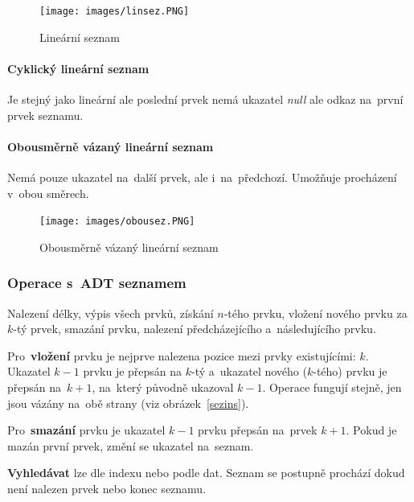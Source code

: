 \begin{figure}[ht]
	\centering
	\texttt{[image: images/linsez.PNG]}
	\caption{Lineární seznam}
	\label{linsez}
\end{figure}

\paragraph{Cyklický lineární seznam} Je stejný jako lineární ale poslední prvek nemá ukazatel \emph{null} ale odkaz na~první prvek seznamu.

\paragraph{Obousměrně vázaný lineární seznam} Nemá pouze ukazatel na~další prvek, ale i~na~předchozí. Umožňuje procházení v~obou směrech.

\begin{figure}[ht]
	\centering
	\texttt{[image: images/obousez.PNG]}
	\caption{Obousměrně vázaný lineární seznam}
	\label{obousez}
\end{figure}

\subsubsection{Operace s~ADT seznamem}

Nalezení délky, výpis všech prvků, získání $n$-tého prvku, vložení nového prvku za $k$-tý prvek, smazání prvku, nalezení předcházejícího a~následujícího prvku.

Pro~\textbf{vložení} prvku je nejprve nalezena pozice mezi prvky existujícími: $k$. Ukazatel $k-1$ prvku je přepsán na $k$-tý a~ukazatel nového ($k$-tého) prvku je přepsán na~$k+1$, na~který původně ukazoval $k-1$. Operace fungují stejně, jen jsou vázány na~obě strany (viz obrázek~\ref{sezins}).

Pro~\textbf{smazání} prvku je ukazatel $k-1$ prvku přepsán na~prvek $k+1$. Pokud je mazán první prvek, změní se ukazatel na~seznam.

\textbf{Vyhledávat} lze dle indexu nebo podle dat. Seznam se postupně prochází dokud není nalezen prvek nebo konec seznamu.

